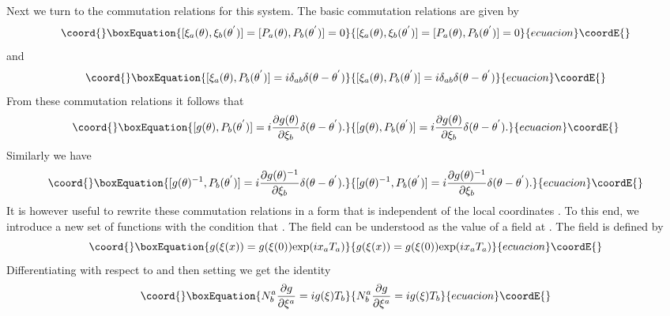 \documentclass[a4paper,12pt]{article}
\begin{document}
Next we turn to the commutation relations for this system.
The basic commutation relations  are given by
\begin{equation}\coord{}\boxEquation{
[{\xi}_a(\theta),{\xi}_b({\theta}^{'})]=[P_a({\theta}),P_b({\theta}^{'})]=0 
}{
[{\xi}_a(\theta),{\xi}_b({\theta}^{'})]=[P_a({\theta}),P_b({\theta}^{'})]=0 
}{ecuacion}\coordE{}\end{equation}
and
\begin{equation}\coord{}\boxEquation{
[{\xi}_a(\theta),P_b({\theta}^{'})]=
i{\delta}_{ab}{\delta}(\theta - {\theta}^{'})
}{
[{\xi}_a(\theta),P_b({\theta}^{'})]=
i{\delta}_{ab}{\delta}(\theta - {\theta}^{'})
}{ecuacion}\coordE{}\end{equation}
From these commutation relations it follows that
\begin{equation}\coord{}\boxEquation{
[g(\theta),P_b({\theta}^{'})]=i\frac{{\partial}{g(\theta)}}{{\partial} 
{\xi}_b}{\delta}({\theta} - {\theta}^{'}).
}{
[g(\theta),P_b({\theta}^{'})]=i\frac{{\partial}{g(\theta)}}{{\partial} 
{\xi}_b}{\delta}({\theta} - {\theta}^{'}).
}{ecuacion}\coordE{}\end{equation}
Similarly we have
\begin{equation}\coord{}\boxEquation{
[g(\theta)^{-1},P_b({\theta}^{'})]=i\frac{{\partial}{g(\theta)^{-1}}}
{{\partial}{\xi}_b}{\delta}({\theta} - {\theta}^{'}).
}{
[g(\theta)^{-1},P_b({\theta}^{'})]=i\frac{{\partial}{g(\theta)^{-1}}}
{{\partial}{\xi}_b}{\delta}({\theta} - {\theta}^{'}).
}{ecuacion}\coordE{}\end{equation} 
It is however useful to rewrite 
these commutation relations in a  form that is independent of the local
coordinates \myHighlight{$\xi$}\coordHE{} \cite{bal}.
 To this end,
we  introduce a new set of functions 
\coordHE{} with the condition that
\coordHE{} . The field \coordHE{} can
 be understood as the value of a field \coordHE{} at \coordHE{} . The
 field \coordHE{} is defined by
\begin{equation}\coord{}\boxEquation{
g({\xi}(x))=g({\xi}(0)) {\rm exp} (ix_a T_a)
}{
g({\xi}(x))=g({\xi}(0)) {\rm exp} (ix_a T_a)
}{ecuacion}\coordE{}\end{equation}
Differentiating with respect to \coordHE{} and then setting \coordHE{}
 we get the  identity
\begin{equation}\coord{}\boxEquation{
N^{a}_{b} \frac{{\partial}g}{{\partial}{\xi}^a} = i g({\xi}) T_b
}{
N^{a}_{b} \frac{{\partial}g}{{\partial}{\xi}^a} = i g({\xi}) T_b
}{ecuacion}\coordE{}\end{equation}
\end{document}
